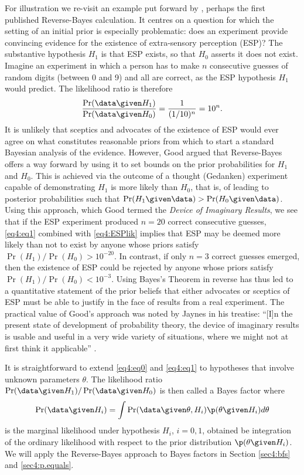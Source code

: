 For illustration we re-visit an example put forward by \citet[p. 35]{Good1950},
perhaps the first published Reverse-Bayes calculation. It centres on a question
for which the setting of an initial prior is especially problematic: does an
experiment provide convincing evidence for the existence of extra-sensory
perception (ESP)? The substantive hypothesis $H_{1}$ is that ESP exists, so that
$H_{0}$ asserts it does not exist. Imagine an experiment in which a person has
to make $n$ consecutive guesses of random digits (between 0 and 9) and all are
correct, as the ESP hypothesis $H_{1}$ would predict. The likelihood ratio is
therefore
\begin{equation}\label{eq4:ESPlik}
   \frac{\Pr(\data \given H_{1})}{\Pr(\data \given H_{0})} = \frac{1}{(1/10)^n} = 10^n .
\end{equation}
It is unlikely that sceptics and advocates of the existence of ESP would ever
agree on what constitutes reasonable priors from which to start a standard
Bayesian analysis of the evidence. However, Good argued that Reverse-Bayes
offers a way forward by using it to set bounds on the prior probabilities for
$H_{1}$ and $H_{0}$. This is achieved via the outcome of a thought (Gedanken)
experiment capable of demonstrating $H_{1}$ is more likely than $H_{0}$, that
is, of leading to posterior probabilities such that
$\Pr(H_1 \given \data) > \Pr(H_0 \given \data)$. Using this approach, which Good
termed the \emph{Device of Imaginary Results}, we see that if the ESP experiment
produced $n=20$ correct consecutive guesses, \eqref{eq4:eq1} combined with
\eqref{eq4:ESPlik} implies that ESP may be deemed more likely than not to exist
by anyone whose priors satisfy ${\Pr(H_{1})}/{\Pr(H_{0})} > 10^{-20}$. In
contrast, if only $n = 3$ correct guesses emerged, then the existence of ESP
could be rejected by anyone whose priors satisfy
${\Pr(H_{1})}/{\Pr(H_{0})} < 10^{-3}$. Using Bayes's Theorem in reverse has thus
led to a quantitative statement of the prior beliefs that either advocates or
sceptics of ESP must be able to justify in the face of results from a real
experiment. The practical value of Good's approach was noted by Jaynes in his
treatise: ``[I]n the present state of development of probability theory, the
device of imaginary results is usable and useful in a very wide variety of
situations, where we might not at first think it applicable''
\citep[p. 125--126]{Jaynes2003}.

It is straightforward to extend \eqref{eq4:eq0} and \eqref{eq4:eq1} to hypotheses
that involve unknown parameters $\theta$. The likelihood ratio
$\Pr(\data \given H_{1})/\Pr(\data \given H_{0})$ is then called a Bayes factor
\citep{Jeffreys1961, Kass1995} where
\begin{equation*}
  \Pr(\data \given H_{i}) = \int \Pr(\data \given \theta, H_{i}) \p(\theta \given H_{i}) d
  \theta
\end{equation*}
is the marginal likelihood under hypothesis $H_i$, $i=0,1$, obtained be
integration of the ordinary likelihood with respect to the prior distribution
$\p(\theta \given H_i)$. We will apply the Reverse-Bayes approach to Bayes
factors in Section \ref{sec4:bfs} and \ref{sec4:p.equals}.


